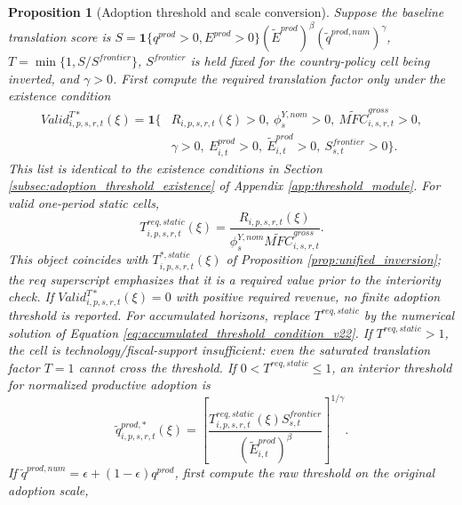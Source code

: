 \documentclass[11pt,a4paper]{article}
\newtheorem{proposition}{Proposition}
\begin{document}
\begin{proposition}[Adoption threshold and scale conversion]\label{prop:q_threshold_v10}
Suppose the baseline translation score is $S=\mathbf{1}\{q^{prod}>0,E^{prod}>0\}(\tilde E^{prod})^{\beta}(\tilde q^{prod,num})^{\gamma}$, $T=\min\{1,S/S^{frontier}\}$, $S^{frontier}$ is held fixed for the country-policy cell being inverted, and $\gamma>0$. First compute the required translation factor only under the existence condition
\begin{equation}\label{eq:valid_treq_theory_v20}
\begin{split}
    Valid^{T*}_{i,p,s,r,t}(\xi)=\mathbf{1}\{&R_{i,p,s,r,t}(\xi)>0,\ \phi^{Y,nom}_s>0,\ \widetilde{MFC}^{gross}_{i,s,r,t}>0,\\
    &\gamma>0,\ E^{prod}_{i,t}>0,\ \tilde E^{prod}_{i,t}>0,\ S^{frontier}_{s,t}>0\}.
\end{split}
\end{equation}
This list is identical to the existence conditions in Section \ref{subsec:adoption_threshold_existence} of Appendix \ref{app:threshold_module}.
For valid one-period static cells,
\begin{equation}\label{eq:T_req_theory_v10}
    T^{req,static}_{i,p,s,r,t}(\xi)=\frac{R_{i,p,s,r,t}(\xi)}{\phi^{Y,nom}_s \widetilde{MFC}^{gross}_{i,s,r,t}}.
\end{equation}
This object coincides with $T^{*,static}_{i,p,s,r,t}(\xi)$ of Proposition \ref{prop:unified_inversion}; the $req$ superscript emphasizes that it is a required value prior to the interiority check. If $Valid^{T*}_{i,p,s,r,t}(\xi)=0$ with positive required revenue, no finite adoption threshold is reported. For accumulated horizons, replace $T^{req,static}$ by the numerical solution of Equation \eqref{eq:accumulated_threshold_condition_v22}. If $T^{req,static}>1$, the cell is technology/fiscal-support insufficient: even the saturated translation factor $T=1$ cannot cross the threshold. If $0<T^{req,static}\leq1$, an interior threshold for normalized productive adoption is
\begin{equation}\label{eq:qtilde_star_theory_v10}
    \tilde q^{prod,*}_{i,p,s,r,t}(\xi)=
    \left[
    \frac{T^{req,static}_{i,p,s,r,t}(\xi)S^{frontier}_{s,t}}
    {(\tilde E^{prod}_{i,t})^{\beta}}
    \right]^{1/\gamma}.
\end{equation}
If $\tilde q^{prod,num}=\epsilon+(1-\epsilon)q^{prod}$, first compute the raw threshold on the original adoption scale,
\begin{equation}\label{eq:q_star_original_scale_v10}

\end{equation}
\end{proposition}
\end{document}
